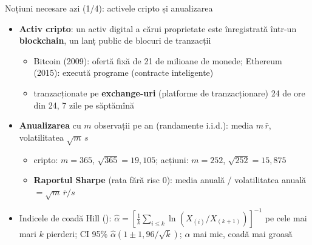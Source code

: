 \begin{frame}{Noțiuni necesare azi (1/4): activele cripto și anualizarea}
\itemsize{\small}
\begin{itemize}
    \item \textbf{Activ cripto}: un activ digital a cărui proprietate este înregistrată într-un \textbf{blockchain}, un lanț public de blocuri de tranzacții
    \begin{itemize}
        \item Bitcoin (2009): ofertă fixă de 21 de milioane de monede; Ethereum (2015): execută programe (contracte inteligente)
        \item tranzacționate pe \textbf{exchange-uri} (platforme de tranzacționare) 24 de ore din 24, 7 zile pe săptămînă
    \end{itemize}
    \item \textbf{Anualizarea} cu $m$ observații pe an (randamente i.i.d.): media $m\,\bar r$, volatilitatea $\sqrt{m}\,s$
    \begin{itemize}
        \item cripto: $m = 365$, $\sqrt{365} = 19{,}105$; acțiuni: $m = 252$, $\sqrt{252} = 15{,}875$
        \item \textbf{Raportul Sharpe} (rata fără risc 0): media anuală / volatilitatea anuală $= \sqrt{m}\,\bar r/s$
    \end{itemize}
    \item Indicele de coadă Hill (): $\hat\alpha = [\frac1k\sum_{i \le k}\ln(X_{(i)}/X_{(k+1)})]^{-1}$ pe cele mai mari $k$ pierderi; CI 95\% $\hat\alpha(1 \pm 1{,}96/\sqrt{k})$; $\alpha$ mai mic, coadă mai groasă
\end{itemize}
\end{frame}

